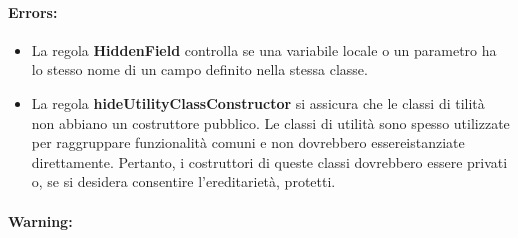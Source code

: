 \paragraph{Errors:}

	\begin{itemize}

		\item La regola \textbf{\textbf{HiddenField}} controlla se una variabile locale o un parametro ha lo stesso nome di un campo  definito nella stessa classe.

		\item La regola \textbf{\textbf{hideUtilityClassConstructor}} si assicura che le classi di tilità non abbiano un costruttore pubblico. Le classi di utilità sono spesso utilizzate per raggruppare funzionalità comuni e non dovrebbero essereistanziate direttamente. Pertanto, i costruttori di queste classi dovrebbero essere privati o, se si desidera consentire l’ereditarietà, protetti.

	\end{itemize}

\paragraph{Warning:}

